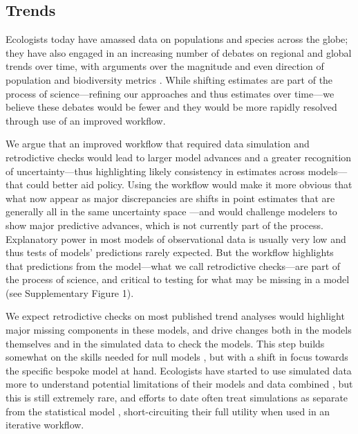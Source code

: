\documentclass[11pt]{article}
\newcommand{\llabel}[1]{\hypertarget{lintarget:#1}{}\linelabel{lin:#1}}
\begin{document}
\subsection{Trends}

Ecologists today have amassed data on populations and species across the globe; they have also engaged in an increasing number of debates on regional and global trends over time, with arguments over the magnitude and even direction of population and biodiversity metrics \citep{Dornelas2014,Leung2020,terry2022no,muller2024weather}. While shifting estimates are part of the process of science---refining our approaches and thus estimates over time---we believe these debates would be fewer and they would be more rapidly resolved through use of an improved workflow. %

We argue that an improved workflow that required data simulation and retrodictive checks would lead to larger model advances and a greater recognition of uncertainty---thus highlighting likely consistency in estimates across models---that could better aid policy.  Using the workflow would make it more obvious that what now appear as major discrepancies are shifts in point estimates that are generally all in the same uncertainty space \citep{Johnson2024}---and would challenge modelers to show major predictive advances, which is not currently part of the process. Explanatory power in most models of observational data is usually very low \citep{low2014rising,moller2002much} and thus tests of models' predictions rarely expected. But the workflow highlights that predictions from the model---what we call retrodictive checks---are part of the process of science, and critical to testing for what may be missing in a model \llabel{suppfig3}(see Supplementary Figure 1). 

We expect retrodictive checks on most published trend analyses would highlight major missing components in these models, and drive changes both in the models themselves and in the simulated data to check the models. This step builds somewhat on the skills needed for null models \citep{Gotelli:2012oz}, but with a shift in focus towards the specific bespoke model at hand. Ecologists have started to use simulated data more to understand potential limitations of their models and data combined \citep{Hilborn1997}, but this is still extremely rare, and efforts to date often treat simulations as separate from the statistical model \citep{Buschke2021,dove2023quantifying}, short-circuiting their full utility when used in an iterative workflow.
\end{document}
